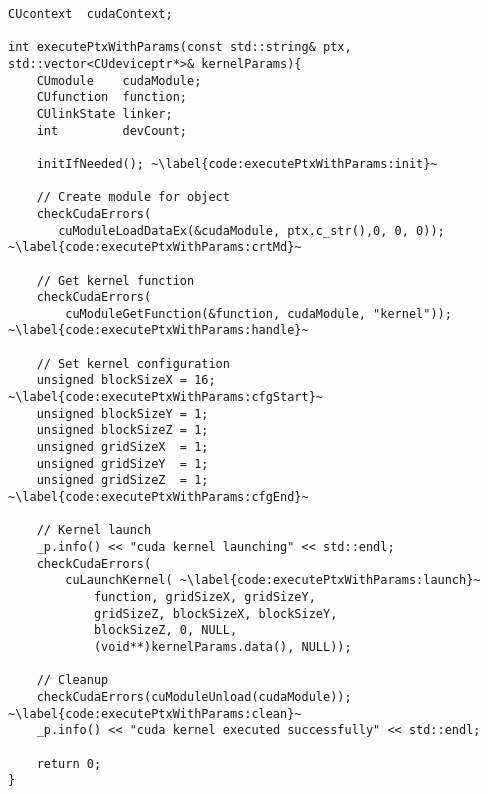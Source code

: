 \begin{lstlisting}[caption={int executePtxWithParams()}, label={code:executePtxWithParams}]
CUcontext  cudaContext;

int executePtxWithParams(const std::string& ptx, std::vector<CUdeviceptr*>& kernelParams){
    CUmodule    cudaModule;
    CUfunction  function;
    CUlinkState linker;
    int         devCount;

    initIfNeeded(); ~\label{code:executePtxWithParams:init}~

    // Create module for object
    checkCudaErrors(
       cuModuleLoadDataEx(&cudaModule, ptx.c_str(),0, 0, 0)); ~\label{code:executePtxWithParams:crtMd}~

    // Get kernel function
    checkCudaErrors(
        cuModuleGetFunction(&function, cudaModule, "kernel")); ~\label{code:executePtxWithParams:handle}~

    // Set kernel configuration
    unsigned blockSizeX = 16;  ~\label{code:executePtxWithParams:cfgStart}~
    unsigned blockSizeY = 1;
    unsigned blockSizeZ = 1;
    unsigned gridSizeX  = 1;
    unsigned gridSizeY  = 1;
    unsigned gridSizeZ  = 1; ~\label{code:executePtxWithParams:cfgEnd}~

    // Kernel launch
    _p.info() << "cuda kernel launching" << std::endl;
    checkCudaErrors(
        cuLaunchKernel( ~\label{code:executePtxWithParams:launch}~
            function, gridSizeX, gridSizeY,
            gridSizeZ, blockSizeX, blockSizeY,
            blockSizeZ, 0, NULL, 
            (void**)kernelParams.data(), NULL));

    // Cleanup
    checkCudaErrors(cuModuleUnload(cudaModule)); ~\label{code:executePtxWithParams:clean}~
    _p.info() << "cuda kernel executed successfully" << std::endl;

    return 0;
}
\end{lstlisting}
